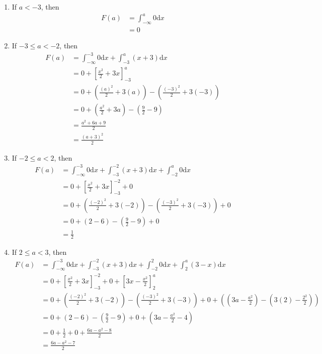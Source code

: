 \documentclass[11pt]{article} %
\begin{document}
\begin{enumerate}
\item If $a < -3$, then 
\begin{align*}
F(a)   & = \int_{-\infty}^a 0 \text{d} x  \\
& = 0
\end{align*}
\item If $-3 \leq a < -2$, then 
\begin{align*}
F(a) & = \int_{-\infty}^{-3} 0 \text{d} x + \int_{-3}^a (x+3) \text{d} x \\
& = 0 + \left[ \frac{x^2}{2} + 3x\right]_{-3}^{a} \\
& = 0 + \left( \frac{(a)^2}{2} + 3(a)\right) - \left( \frac{(-3)^2}{2} + 3(-3) \right) \\
& = 0 + (\frac{a^2}{2}+3a) - (\frac{9}{2} - 9) \\
& = \frac{a^2+6a+9}{2} \\
& = \frac{(a+3)^2}{2}
\end{align*}
\item If $-2 \leq a < 2$, then
\begin{align*}
F(a) & = \int_{-\infty}^{-3} 0 \text{d} x + \int_{-3}^{-2} (x+3) \text{d} x + \int_{-2}^{a} 0 \text{d} x\\
& = 0 + \left[ \frac{x^2}{2} + 3x\right]_{-3}^{-2} + 0 \\
& = 0 + \left( \frac{(-2)^2}{2} + 3(-2)\right) - \left( \frac{(-3)^2}{2} + 3(-3) \right)  + 0\\
& = 0 + (2-6) - (\frac{9}{2} - 9)  + 0\\
& = \frac{1}{2} 
\end{align*}
\item If $2 \leq a < 3$, then 
\begin{align*}
F(a) & = \int_{-\infty}^{-3} 0 \text{d} x + \int_{-3}^{-2} (x+3) \text{d} x + \int_{-2}^{2} 0 \text{d} x + \int_{2}^a (3-x) \text{d} x\\
& = 0 + \left[ \frac{x^2}{2} + 3x\right]_{-3}^{-2} + 0 + \left[3x - \frac{x^2}{2} \right]_{2}^a \\
& = 0 + \left( \frac{(-2)^2}{2} + 3(-2)\right) - \left( \frac{(-3)^2}{2} + 3(-3) \right) + 0 + \left( \left(3a-\frac{a^2}{2} \right) - \left( 3(2) - \frac{2^2}{2}\right) \right) \\
& = 0 + (2-6) - (\frac{9}{2} - 9) + 0 + \left( 3a - \frac{a^2}{2} -4 \right) \\
& = 0 + \frac{1}{2} + 0 + \frac{6a - a^2 -8}{2} \\
& = \frac{6a - a^2 -7}{2}
\end{align*}

\end{enumerate}
\end{document}
